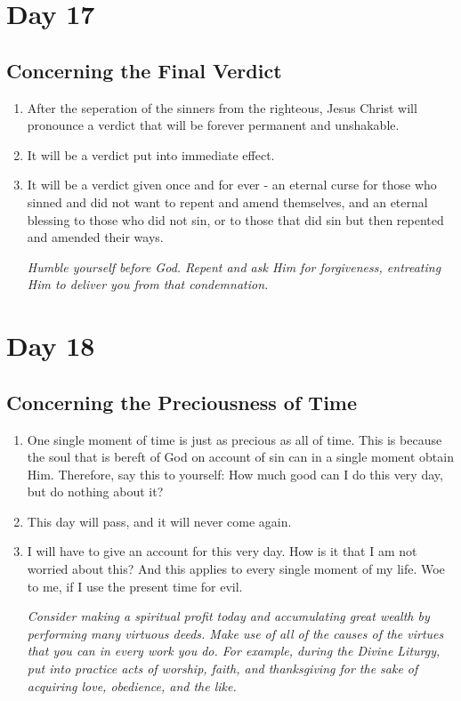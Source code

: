 \documentclass[11pt]{article}
\begin{document}
\section{Day 17}
\label{sec:org0e20924}
\subsection{Concerning the Final Verdict}
\label{sec:org6fefc89}
\begin{enumerate}
\item After the seperation of the sinners from the righteous, Jesus Christ will pronounce a verdict that will be forever permanent and unshakable.
\item It will be a verdict put into immediate effect.
\item It will be a verdict given once and for ever - an eternal curse for those who sinned and did not want to repent and amend themselves, and an eternal
blessing to those who did not sin, or to those that did sin but then repented and amended their ways.

\emph{Humble yourself before God. Repent and ask Him for forgiveness, entreating Him to deliver you from that condemnation.}
\end{enumerate}
\section{Day 18}
\label{sec:org10cee41}
\subsection{Concerning the Preciousness of Time}
\label{sec:orgda09179}
\begin{enumerate}
\item One single moment of time is just as precious as all of time. This is because the soul that is bereft of God on account of sin can in a single moment
obtain Him. Therefore, say this to yourself: How much good can I do this very day, but do nothing about it?
\item This day will pass, and it will never come again.
\item I will have to give an account for this very day. How is it that I am not worried about this? And this applies to every single moment of my life.
Woe to me, if I use the present time for evil.

\emph{Consider making a spiritual profit today and accumulating great wealth by performing many virtuous deeds. Make use of all of the causes of the virtues}
\emph{that you can in every work you do. For example, during the Divine Liturgy, put into practice acts of worship, faith, and thanksgiving for the sake of}
\emph{acquiring love, obedience, and the like.}
\end{enumerate}
\end{document}

